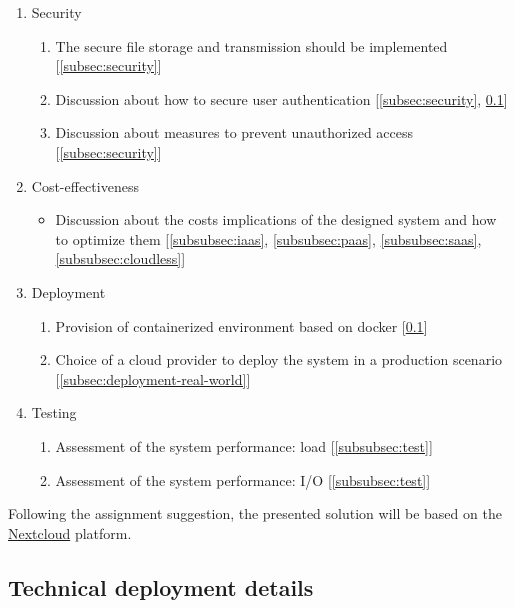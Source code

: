 \begin{enumerate}
    \item{Security}
    \begin{enumerate}
        \itemsep0em
        \item The secure file storage and transmission should be implemented [\ref{subsec:security}]
        \item Discussion about how to secure user authentication [\ref{subsec:security}, \ref{subsec:deployment}]
        \item Discussion about measures to prevent unauthorized access [\ref{subsec:security}]
    \end{enumerate}

    \item{Cost-effectiveness}
    \begin{itemize}
        \itemsep0em
        \item Discussion about the costs implications of the designed system and how to optimize them [\ref{subsubsec:iaas}, \ref{subsubsec:paas}, \ref{subsubsec:saas}, \ref{subsubsec:cloudless}]
    \end{itemize}

    \item{Deployment}
    \begin{enumerate}
        \itemsep0em
        \item Provision of containerized environment based on docker [\ref{subsec:deployment}]
        \item Choice of a cloud provider to deploy the system in a production scenario [\ref{subsec:deployment-real-world}]
    \end{enumerate}

    \item{Testing}
    \begin{enumerate}
        \itemsep0em
        \item Assessment of the system performance: load [\ref{subsubsec:test}]
        \item Assessment of the system performance: I/O  [\ref{subsubsec:test}]
    \end{enumerate}
\end{enumerate}

Following the assignment suggestion, the presented solution will be based on the \href{https://nextcloud.com/}{Nextcloud} platform.

\subsection{Technical deployment details}
\label{subsec:deployment}

